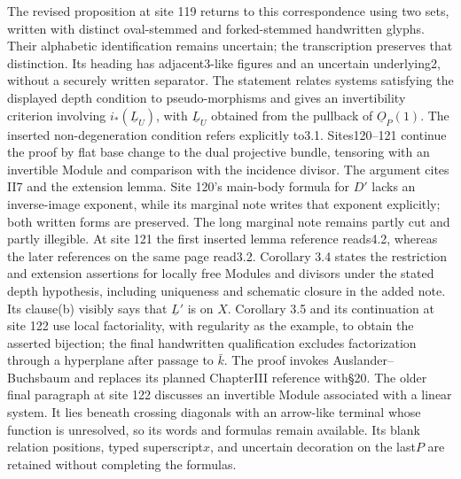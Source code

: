 The revised proposition at site 119 returns to this correspondence using two sets, written with distinct oval-stemmed and forked-stemmed handwritten glyphs. Their alphabetic identification remains uncertain; the transcription preserves that distinction. Its heading has adjacent3-like figures and an uncertain underlying2, without a securely written separator. The statement relates systems satisfying the displayed depth condition to pseudo-morphisms and gives an invertibility criterion involving $i_*(\underline L_U)$, with $\underline L_U$ obtained from the pullback of $\underline O_P(1)$. The inserted non-degeneration condition refers explicitly to3.1. Sites120--121 continue the proof by flat base change to the dual projective bundle, tensoring with an invertible Module and comparison with the incidence divisor. The argument cites II7 and the extension lemma. Site 120's main-body formula for $D'$ lacks an inverse-image exponent, while its marginal note writes that exponent explicitly; both written forms are preserved. The long marginal note remains partly cut and partly illegible. At site 121 the first inserted lemma reference reads4.2, whereas the later references on the same page read3.2. Corollary 3.4 states the restriction and extension assertions for locally free Modules and divisors under the stated depth hypothesis, including uniqueness and schematic closure in the added note. Its clause(b) visibly says that $\underline L'$ is on $X$. Corollary 3.5 and its continuation at site 122 use local factoriality, with regularity as the example, to obtain the asserted bijection; the final handwritten qualification excludes factorization through a hyperplane after passage to $\bar k$. The proof invokes Auslander--Buchsbaum and replaces its planned ChapterIII reference with\S20. The older final paragraph at site 122 discusses an invertible Module associated with a linear system. It lies beneath crossing diagonals with an arrow-like terminal whose function is unresolved, so its words and formulas remain available. Its blank relation positions, typed superscript$x$, and uncertain decoration on the last$P$ are retained without completing the formulas.
